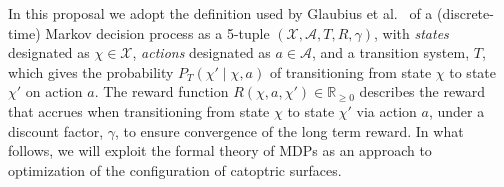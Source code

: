 In this proposal we adopt the definition used by Glaubius et al.~\cite{gtsg08}
of a (discrete-time) Markov decision process as a 5-tuple
$(\mathcal{X}, \mathcal{A}, T, R, \gamma)$, with \emph{states} designated
as $\chi \in \mathcal{X}$, \emph{actions} designated as $a \in \mathcal{A}$,
and a transition system, $T$, which gives the probability
$P_T (\chi' \mid \chi, a)$ of transitioning from state $\chi$ to
state $\chi'$ on action $a$.
The reward function $R(\chi, a, \chi') \in \mathbb R_{\ge 0}$ describes the
reward that accrues when transitioning from state $\chi$ to
state $\chi'$ via action $a$, under a discount factor, $\gamma$,
to ensure convergence of the long term reward.
In what follows, we will exploit the formal theory of MDPs as an
approach to optimization of the configuration of catoptric surfaces.

